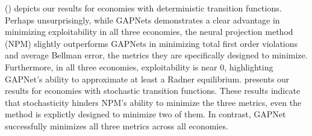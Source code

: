  () depicts our results for economies with deterministic transition functions.
Perhaps unsurprisingly, while GAPNets demonstrates a clear advantage in minimizing exploitability in all three economies, the neural projection method (NPM) slightly outperforms GAPNets in minimizing total first order violations and average Bellman error, the metrics they are specifically designed to minimize.
Furthermore, in all three economies, exploitability is near 0, highlighting GAPNet's ability to approximate at least a Radner equilibrium. 
 presents our results for economies with stochastic transition functions. 
These results indicate that stochasticity hinders NPM's ability to minimize the three metrics, even the method is explictly designed to minimize two of them.
In contrast, GAPNet successfully minimizes all three metrics across all economies.

